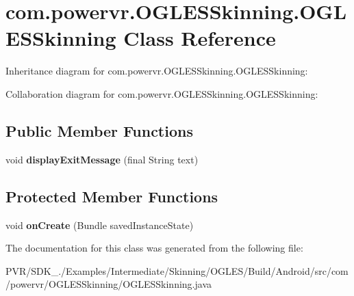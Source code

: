 \hypertarget{classcom_1_1powervr_1_1_o_g_l_e_s_skinning_1_1_o_g_l_e_s_skinning}{\section{com.\+powervr.\+O\+G\+L\+E\+S\+Skinning.\+O\+G\+L\+E\+S\+Skinning Class Reference}
\label{classcom_1_1powervr_1_1_o_g_l_e_s_skinning_1_1_o_g_l_e_s_skinning}
}


Inheritance diagram for com.\+powervr.\+O\+G\+L\+E\+S\+Skinning.\+O\+G\+L\+E\+S\+Skinning\+:


Collaboration diagram for com.\+powervr.\+O\+G\+L\+E\+S\+Skinning.\+O\+G\+L\+E\+S\+Skinning\+:
\subsection*{Public Member Functions}
\begin{DoxyCompactItemize}
\item 
\hypertarget{classcom_1_1powervr_1_1_o_g_l_e_s_skinning_1_1_o_g_l_e_s_skinning_ac44f14092b8664fa4f07b552d449deb0}{void {\bfseries display\+Exit\+Message} (final String text)}\label{classcom_1_1powervr_1_1_o_g_l_e_s_skinning_1_1_o_g_l_e_s_skinning_ac44f14092b8664fa4f07b552d449deb0}

\end{DoxyCompactItemize}
\subsection*{Protected Member Functions}
\begin{DoxyCompactItemize}
\item 
\hypertarget{classcom_1_1powervr_1_1_o_g_l_e_s_skinning_1_1_o_g_l_e_s_skinning_a479839f92209ebd6158036098fc34045}{void {\bfseries on\+Create} (Bundle saved\+Instance\+State)}\label{classcom_1_1powervr_1_1_o_g_l_e_s_skinning_1_1_o_g_l_e_s_skinning_a479839f92209ebd6158036098fc34045}

\end{DoxyCompactItemize}


The documentation for this class was generated from the following file\+:\begin{DoxyCompactItemize}
\item 
P\+V\+R/\+S\+D\+K\+\_./\+Examples/\+Intermediate/\+Skinning/\+O\+G\+L\+E\+S/\+Build/\+Android/src/com/powervr/\+O\+G\+L\+E\+S\+Skinning/O\+G\+L\+E\+S\+Skinning.\+java\end{DoxyCompactItemize}
